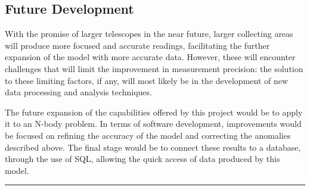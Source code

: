 \documentclass[11pt]{article}
\begin{document}
\hypertarget{future-development}{%
\subsection{Future Development}\label{future-development}}

With the promise of larger telescopes in the near future, larger
collecting areas will produce more focused and accurate readings,
facilitating the further expansion of the model with more accurate data.
However, these will encounter challenges that will limit the improvement
in measurement precision: the solution to these limiting factors, if
any, will most likely be in the development of new data processing and
analysis techniques.

The future expansion of the capabilities offered by this project would
be to apply it to an N-body problem. In terms of software development,
improvements would be focused on refining the accuracy of the model and
correcting the anomalies described above. The final stage would be to
connect these results to a database, through the use of SQL, allowing
the quick access of data produced by this model.

\newpage

\begin{center}\rule{0.5\linewidth}{0.5pt}\end{center}

\printbibliography
     
\end{document}
